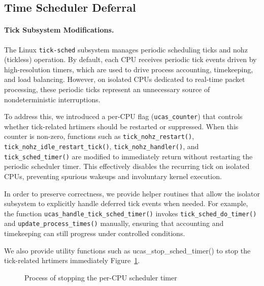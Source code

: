 \documentclass[letterpaper]{article}
\begin{document}
\subsection{Time Scheduler Deferral}
\paragraph{Tick Subsystem Modifications.}
The Linux \texttt{tick-sched} subsystem manages periodic scheduling ticks and 
nohz (tickless) operation. By default, each CPU receives periodic tick events 
driven by high-resolution timers, which are used to drive process accounting, 
timekeeping, and load balancing. However, on isolated CPUs dedicated to 
real-time packet processing, these periodic ticks represent an unnecessary 
source of nondeterministic interruptions.

To address this, we introduced a per-CPU flag (\texttt{ucas\_counter}) that 
controls whether tick-related hrtimers should be restarted or suppressed. When 
this counter is non-zero, functions such as \texttt{tick\_nohz\_restart()}, 
\texttt{tick\_nohz\_idle\_restart\_tick()}, \texttt{tick\_nohz\_handler()}, 
and \texttt{tick\_sched\_timer()} are modified to immediately return without 
restarting the periodic scheduler timer. This effectively disables the 
recurring tick on isolated CPUs, preventing spurious wakeups and involuntary 
kernel execution.

In order to preserve correctness, we provide helper routines that allow the 
isolator subsystem to explicitly handle deferred tick events when needed. For 
example, the function \texttt{ucas\_handle\_tick\_sched\_timer()} invokes 
\texttt{tick\_sched\_do\_timer()} and \texttt{update\_process\_times()} 
manually, ensuring that accounting and timekeeping can still progress under 
controlled conditions.

We also provide utility functions such as ucas\_stop\_sched\_timer() to stop
the tick-related hrtimers immediately Figure~\ref{fig:stopticker}.
\begin{figure}[h]
\centering
{}
\caption{Process of stopping the per-CPU scheduler timer}
\label{fig:stopticker}
\end{figure}
\end{document}
